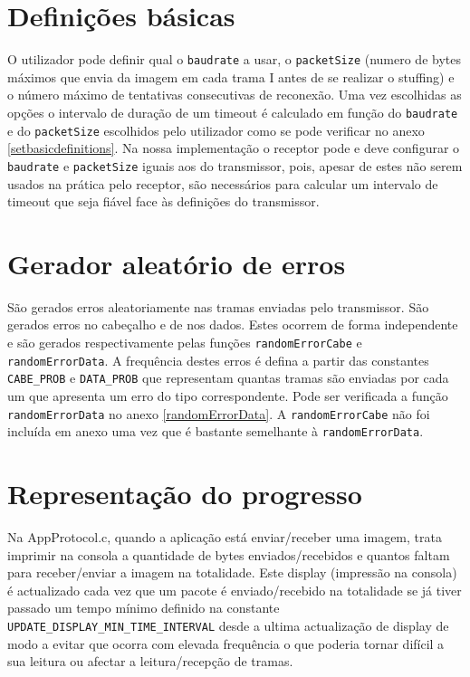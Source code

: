 \documentclass[11pt,a4paper,reqno]{report}
\numberwithin{equation}{section}
\begin{document}
\section{Definições básicas}

O utilizador pode definir qual o \verb|baudrate| a usar, o \verb|packetSize| (numero de bytes máximos que envia da imagem em cada trama I antes de se realizar o stuffing) e o número máximo de tentativas consecutivas de reconexão.
Uma vez escolhidas as opções o intervalo de duração de um timeout é calculado em função do \verb|baudrate| e do \verb|packetSize| escolhidos pelo utilizador como se pode verificar no anexo \ref{setbasicdefinitions}. Na nossa implementação o receptor pode e deve configurar o \verb|baudrate| e \verb|packetSize| iguais aos do transmissor, pois, apesar de estes não serem usados na prática pelo receptor, são necessários para calcular um intervalo de timeout que seja fiável face às definições do transmissor.

\section{Gerador aleatório de erros}
São gerados erros aleatoriamente nas tramas enviadas pelo transmissor. São gerados erros no cabeçalho e de nos dados. Estes ocorrem de forma independente e são gerados respectivamente pelas funções \verb|randomErrorCabe| e \verb|randomErrorData|. A frequência destes erros é defina a partir das constantes \verb|CABE_PROB| e \verb|DATA_PROB| que representam quantas tramas são enviadas por cada um que apresenta um erro do tipo correspondente. Pode ser verificada a função \verb|randomErrorData| no anexo \ref{randomErrorData}. A \verb|randomErrorCabe| não foi incluída em anexo uma vez que é bastante semelhante à \verb|randomErrorData|.

\section{Representação do progresso}
Na AppProtocol.c, quando a aplicação está enviar/receber uma imagem, trata imprimir na consola a quantidade de bytes enviados/recebidos e quantos faltam para receber/enviar a imagem na totalidade. Este display (impressão na consola) é actualizado cada vez que um pacote é enviado/recebido na totalidade se já tiver passado um tempo mínimo definido na constante \verb|UPDATE_DISPLAY_MIN_TIME_INTERVAL| desde a ultima actualização de display de modo a evitar que ocorra com elevada frequência o que poderia tornar difícil a sua leitura ou afectar a leitura/recepção de tramas.
\end{document}
